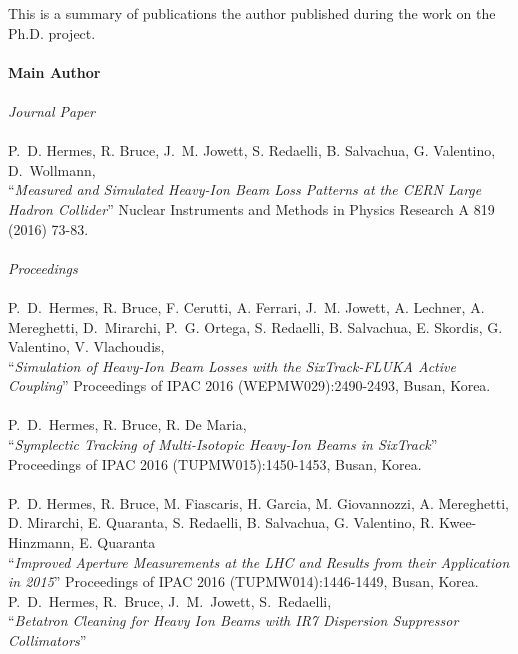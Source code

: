 This is a summary of publications the author published during the work on the Ph.D. project.
\\ \mbox{} \\ 
\large{\textbf{Main Author}}
\normalsize
%
\\ \mbox{} \\
\textit{Journal Paper}
%
\\ \mbox{} \\
P.~D. Hermes, R. Bruce, J.~M. Jowett, S. Redaelli, B. Salvachua, G. Valentino, \mbox{D. Wollmann},  \\
``\textit{Measured and Simulated Heavy-Ion Beam Loss Patterns at the CERN Large Hadron Collider}'' \newline 
Nuclear Instruments and Methods in Physics Research A 819 (2016) 73-83.
%
\\ \mbox{} \\
\textit{Proceedings}
\\ \mbox{} \\
P.~D.~Hermes, R. Bruce, F. Cerutti, A. Ferrari, J.~M. Jowett, A. Lechner, A. Mereghetti, \mbox{D. Mirarchi}, P.~G. Ortega, S. Redaelli, B. Salvachua, E. Skordis, G. Valentino, V. Vlachoudis, \\ 
``\textit{Simulation of Heavy-Ion Beam Losses with the SixTrack-FLUKA Active Coupling}'' \newline
Proceedings of IPAC 2016 (WEPMW029):2490-2493, Busan, Korea. 
%
\\ \mbox{} \\
P.~D.~Hermes, R. Bruce, R. De Maria, \\ 
``\textit{Symplectic Tracking of Multi-Isotopic Heavy-Ion Beams in SixTrack}'' \newline
Proceedings of IPAC 2016 (TUPMW015):1450-1453, Busan, Korea. 
%
\\ \mbox{} \\
P.~D. Hermes, R. Bruce, M. Fiascaris, H. Garcia, M. Giovannozzi, A. Mereghetti, D. Mirarchi, E. Quaranta, S. Redaelli, B. Salvachua, G. Valentino, R. Kwee-Hinzmann, E. Quaranta \\ 
``\textit{Improved Aperture Measurements at the LHC and Results from their Application in 2015}'' \newline
Proceedings of IPAC 2016 (TUPMW014):1446-1449, Busan, Korea. 
% 	
\newpage
P.~D.~Hermes, R.~Bruce, J.~M.~Jowett, S.~Redaelli, \\ 
``\textit{Betatron Cleaning for Heavy Ion Beams with IR7 Dispersion Suppressor Collimators}'' \newline
